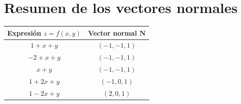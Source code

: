 \documentclass{article}
\begin{document}
\section{Resumen de los vectores normales}
\begin{center}
    \begin{tabular}{|c|c|}
    \hline
    \textbf{Expresión $z = f(x,y)$} & \textbf{Vector normal $\mathbf{N}$} \\
    \hline
    $1 + x + y$ & $(-1, -1, 1)$ \\
    $-2 + x + y$ & $(-1, -1, 1)$ \\
    $x + y$ & $(-1, -1, 1)$ \\
    $1 + 2x + y$ & $(-1, 0, 1)$ \\
    $1 - 2x + y$ & $(2, 0, 1)$ \\
    \hline
    \end{tabular}
\end{center}
\end{document}
